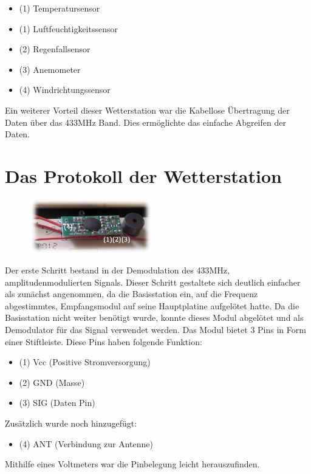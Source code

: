 \documentclass{report}
\begin{document}
\begin{itemize}
    \item (1) Temperatursensor
    \item (1) Luftfeuchtigkeitssensor
    \item (2) Regenfallsensor
    \item (3) Anemometer
    \item (4) Windrichtungssensor
\end{itemize}

Ein weiterer Vorteil dieser Wetterstation war die Kabellose Übertragung der Daten über das 433MHz Band. Dies ermöglichte das einfache Abgreifen der Daten.


\section{Das Protokoll der Wetterstation}
\begin{figure}\centering
    \begin{center}
        \includegraphics[width=0.48\textwidth]{Bilder/Receiver.png}
    \end{center}
\end{figure}
Der erste Schritt bestand in der Demodulation des 433MHz, amplitudenmodulierten Signals. Dieser Schritt gestaltete sich deutlich einfacher als zunächst angenommen, da die Basisstation ein, auf die Frequenz abgestimmtes, Empfangsmodul auf seine Hauptplatine aufgelötet hatte. Da die Basisstation nicht weiter benötigt wurde, konnte dieses Modul abgelötet und als Demodulator für das Signal verwendet werden. Das Modul bietet 3 Pins in Form einer Stiftleiste. Diese Pins haben folgende Funktion:

\begin{itemize}
    \item (1) Vcc (Positive Stromversorgung)
    \item (2) GND (Masse)
    \item (3) SIG (Daten Pin)
\end{itemize}
Zusätzlich wurde noch hinzugefügt:
\begin{itemize}
    \item (4) ANT (Verbindung zur Antenne)
\end{itemize}
Mithilfe eines Voltmeters war die Pinbelegung leicht herauszufinden. 
\end{document}
